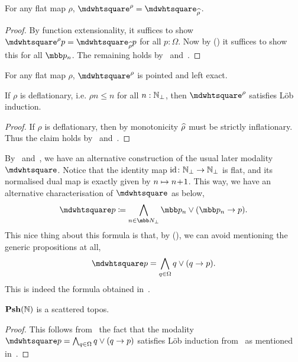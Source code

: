 \begin{corollary}\label{negispos}
  For any flat map $\rho$, $\bx^\rho = \bx_{\pf\rho}$.
\end{corollary}
\begin{proof}
  By function extensionality, it suffices to show $\bx^\rho p = \bx_{\pf\rho}p$ for all $p:\Omega$. Now by (\AxiomGR) it suffices to show this for all $\mbb p_{n}$. The remaining holds by~ and~.
\end{proof}

\begin{corollary}
  For any flat map $\rho$, $\bx^\rho$ is pointed and left exact.
\end{corollary}

\begin{theorem}\label{canonicallob}
  If $\rho$ is deflationary, i.e. $\rho n \le n$ for all $n:\mathbb{N}_\bot$, then $\bx^\rho$ satisfies L\"ob induction.
\end{theorem}
\begin{proof}
  If $\rho$ is deflationary, then by monotonicity $\widehat{\rho}$ must be strictly inflationary. Thus the claim holds by~ and~.
\end{proof}

\begin{remark}\label{canonicalneg}
  By~ and~, we have an alternative construction of the usual later modality $\bx$. Notice that the identity map $\mathrm{id} \colon \mathbb{N}_\bot\to\mathbb{N}_\bot$ is flat, and its normalised dual map is exactly given by $n \mapsto n\!+\!1$. This way, we have an alternative characterisation of $\bx$ as below,
  \[ \bx p \coloneq \bigwedge_{n\in\ovob} \mbb p_{n} \vee (\mbb p_{n} \to p). \]
  This nice thing about this formula is that, by (\AxiomGR), we can avoid mentioning the generic propositions at all,
  \[ \bx p = \bigwedge_{q\in\Omega} q \vee (q \to p). \]
  This is indeed the formula obtained in~\cite{ESAKIA200097}.
\end{remark}

\begin{corollary}
  $\mathbf{Psh}(\mathbb{N})$ is a scattered topos.
\end{corollary}
\begin{proof}
  This follows from~\citet[Thm.~2]{ESAKIA200097} the fact that the modality $\bx p = \bigwedge_{q\in\Omega} q \vee (q \to p)$ satisfies L\"ob induction from~ as mentioned in~.
\end{proof}

